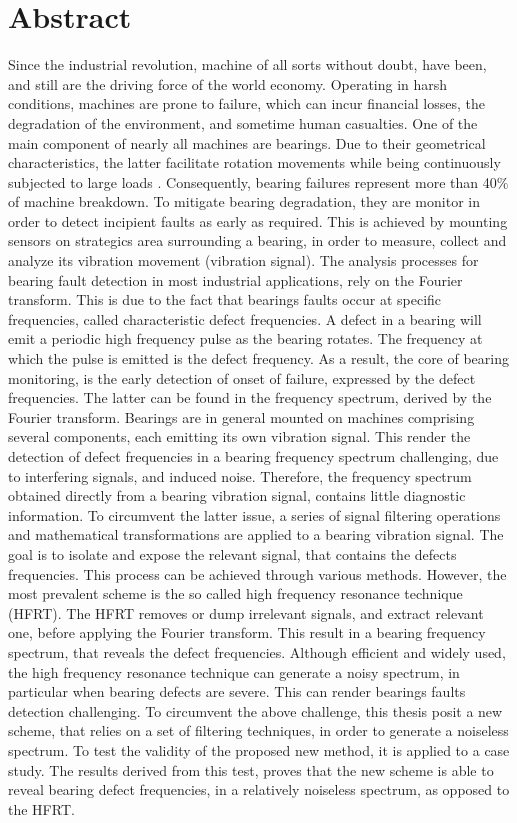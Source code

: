 \documentclass[../Main/thesis.tex]{subfiles}
\begin{document}
\null\vfill
{}
\chapter*{Abstract}
Since the industrial revolution, machine of all sorts without doubt, have been, and still are the driving force of the world economy.
Operating in harsh conditions, machines are prone to failure, which can incur financial losses, the degradation of the environment, and sometime human casualties. 
\justify
 One of the main component of nearly all machines are bearings. Due to their  geometrical characteristics, the latter facilitate rotation movements while being continuously subjected to large loads . Consequently, bearing failures represent more than 40$\%$ of machine breakdown. To mitigate bearing degradation, they are monitor in order to detect incipient faults as early as required. This is achieved by mounting sensors on strategics area   surrounding a bearing, in order to measure, collect and analyze its vibration movement (vibration signal). 
 \justify
The analysis processes for bearing fault detection in most industrial applications, rely on the Fourier transform. This is due to the fact that bearings faults occur at specific frequencies, called characteristic defect frequencies. A defect in a bearing will emit a periodic high frequency pulse as the bearing rotates. The frequency at which the pulse is emitted is the defect frequency.
 As a result, the core of bearing monitoring, is the early detection of onset of failure, expressed by the defect frequencies. The latter can be found in the frequency spectrum, derived by the Fourier transform.
 \justify
 Bearings are in general mounted on machines comprising several components, each emitting its own vibration signal.
 This render the detection of defect frequencies in a bearing frequency spectrum challenging, due to interfering  signals, and induced noise. Therefore, the frequency spectrum obtained directly from a bearing vibration signal, contains little diagnostic information. To circumvent the latter issue, a series of signal filtering operations and mathematical transformations are applied to a bearing vibration signal. The goal is to isolate and expose the relevant signal, that contains the defects frequencies. This process can be achieved through various methods. However, the most prevalent scheme is the so called high frequency resonance technique (HFRT). The HFRT removes or dump irrelevant signals, and extract relevant one, before applying the Fourier transform. This result in a bearing frequency spectrum, that reveals the defect frequencies.
 \justify
 Although efficient and widely used, the high frequency resonance technique can generate a noisy spectrum, in particular when bearing defects are severe. This can render bearings faults detection challenging. To circumvent the above challenge, this thesis posit a new scheme, that relies on a set of filtering techniques, in order to generate a noiseless spectrum. To test the validity of the proposed new method, it is applied to a case study. The results derived from this test, proves that the new scheme is able to reveal bearing defect frequencies, in a relatively noiseless spectrum, as opposed to the HFRT.


\vfill\vfill
\clearpage
\blankpage
\end{document}
